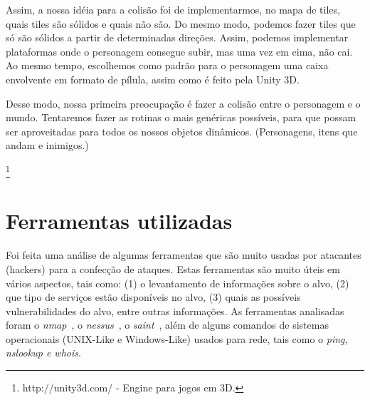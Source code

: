 \documentclass[brazil]{abnt}
\begin{document}
Assim, a nossa idéia para a colisão foi de implementarmos, no mapa de tiles, quais tiles são sólidos e quais não são. Do mesmo modo, podemos fazer tiles que só são sólidos a partir de determinadas direções. Assim, podemos implementar plataformas onde o personagem consegue subir, mas uma vez em cima, não cai. Ao mesmo tempo, escolhemos como padrão para o personagem uma caixa envolvente em formato de pílula, assim como é feito pela Unity 3D.\footnotemark

Desse modo, nossa primeira preocupação é fazer a colisão entre o personagem e o mundo. Tentaremos fazer as rotinas o mais genéricas possíveis, para que possam ser aproveitadas para todos os nossos objetos dinâmicos. (Personagens, itens que andam e inimigos.)

\footnote{http://unity3d.com/ - Engine para jogos em 3D.}

\chapter{Ferramentas utilizadas}

Foi feita uma análise de algumas ferramentas que são muito usadas
por atacantes (hackers) para a confecção de ataques. Estas ferramentas
são muito úteis em vários aspectos, tais como: (1) o levantamento
de informações sobre o alvo, (2) que tipo de serviços estão disponíveis
no alvo, (3) quais as possíveis vulnerabilidades do alvo, entre outras
informações. As ferramentas analisadas foram o \emph{nmap}~,
o \emph{nessus}~, o \emph{saint}~, além
de alguns comandos de sistemas operacionais (UNIX-Like e Windows-Like)
usados para rede, tais como o \emph{ping, nslookup e whois}. 
\end{document}

